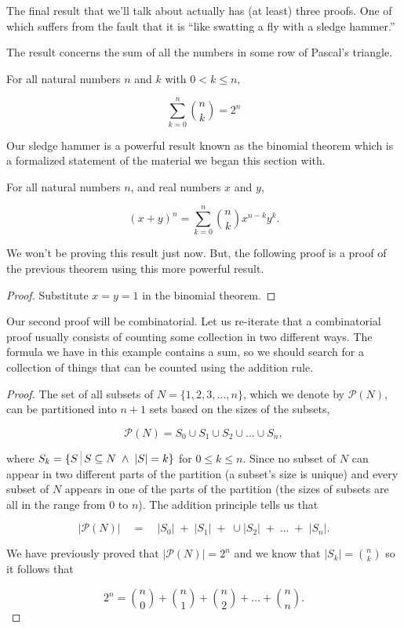The final result that we'll talk about actually has (at least) three proofs. 
One of which suffers from the fault that it is ``like swatting a fly
with a sledge hammer.''

The result concerns the sum of all the numbers in some 
row of Pascal's triangle.


\begin{thm}
For all natural numbers $n$ and $k$ with $0 < k \leq n$,

\[ \sum_{k=0}^n \binom{n}{k} = 2^n \]
\end{thm}

Our sledge hammer is a powerful result known as the binomial theorem
which is a formalized statement of the material we began this section
with. 

\begin{thm}
For all natural numbers $n$, and real numbers $x$ and $y$, 

\[ (x+y)^n = \sum_{k=0}^{n} \binom{n}{k} x^{n-k}y^k. \] 
\end{thm}

We won't be proving this result just now.   But, the following proof
is a proof of the previous theorem using this more powerful result.

\begin{proof}
Substitute $x=y=1$ in the binomial theorem.
\end{proof} 

Our second proof will be combinatorial.
Let us re-iterate that a combinatorial proof usually consists of 
counting some collection in two different ways.  The formula
we have in this example contains a sum, so we should search for 
a collection of things that can be counted using the addition
rule.

\begin{proof} 
The set of all subsets of $N = \{1, 2, 3, \ldots, n\}$, which we
denote by ${\mathcal P}(N)$, can be partitioned into $n+1$ sets based
on the sizes of the subsets,

\[ {\mathcal P}(N) = S_0 \cup S_1 \cup S_2 \cup \ldots \cup S_n, \]

\noindent where $S_k = \{ S \suchthat S \subseteq N \; \land \; |S| = k \}$
for $0 \leq k \leq n$.  Since no subset of $N$ can appear in two different
parts of the partition (a subset's size is unique) and every subset of $N$
appears in one of the parts of the partition (the sizes of subsets are
all in the range from $0$ to $n$).  The addition principle tells us that

\[ |{\mathcal P}(N)| \quad = \quad |S_0| \;+\; |S_1| \;+\;\cup |S_2| \;+\; \ldots \;+\; |S_n|. \]

We have previously proved that $ |{\mathcal P}(N)| = 2^n$ and we know that
$|S_k| = \binom{n}{k}$ so it follows that


\[ 2^n = \binom{n}{0} + \binom{n}{1} +\binom{n}{2} + \ldots + \binom{n}{n}. \] 

\end{proof}

\clearpage






